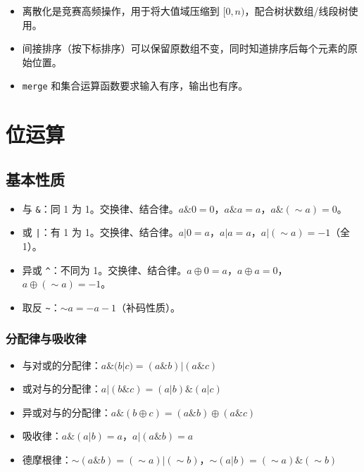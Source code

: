 \documentclass[UTF8,openany,oneside,zihao=-4]{ctexbook}
\begin{document}
\begin{tip}
\begin{itemize}
  \item 离散化是竞赛高频操作，用于将大值域压缩到 $[0, n)$，配合树状数组/线段树使用。
  \item 间接排序（按下标排序）可以保留原数组不变，同时知道排序后每个元素的原始位置。
  \item \lstinline|merge| 和集合运算函数要求输入有序，输出也有序。
\end{itemize}
\end{tip}

\chapter{位运算}

\section{基本性质}

\begin{note}
\begin{itemize}
  \item 与 \lstinline|&|：同 1 为 1。交换律、结合律。$a \& 0 = 0$，$a \& a = a$，$a \& (\sim a) = 0$。
  \item 或 \lstinline{|}：有 1 为 1。交换律、结合律。$a | 0 = a$，$a | a = a$，$a | (\sim a) = -1$（全 1）。
  \item 异或 \lstinline|^|：不同为 1。交换律、结合律。$a \oplus 0 = a$，$a \oplus a = 0$，$a \oplus (\sim a) = -1$。
  \item 取反 \lstinline|~|：$\sim a = -a - 1$（补码性质）。
\end{itemize}
\end{note}

\subsection{分配律与吸收律}

\begin{note}
\begin{itemize}
  \item 与对或的分配律：$a \& (b | c) = (a \& b) | (a \& c)$
  \item 或对与的分配律：$a | (b \& c) = (a | b) \& (a | c)$
  \item 异或对与的分配律：$a \& (b \oplus c) = (a \& b) \oplus (a \& c)$
  \item 吸收律：$a \& (a | b) = a$，$a | (a \& b) = a$
  \item 德摩根律：$\sim(a \& b) = (\sim a) | (\sim b)$，$\sim(a | b) = (\sim a) \& (\sim b)$
\end{itemize}
\end{note}
\end{document}
